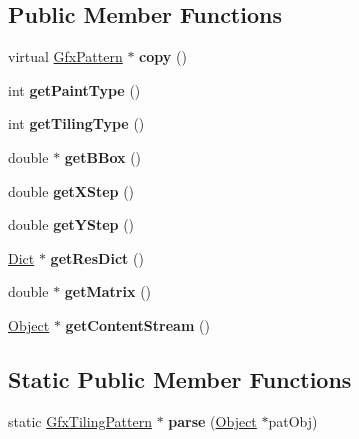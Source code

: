 \subsection*{Public Member Functions}
\begin{DoxyCompactItemize}
\item 
\mbox{\label{class_gfx_tiling_pattern_ad86dcaf392c91d2ad95fc2214c6b4737}} 
virtual \hyperlink{class_gfx_pattern}{Gfx\+Pattern} $\ast$ {\bfseries copy} ()
\item 
\mbox{\label{class_gfx_tiling_pattern_ade1ea4ccd6fb76109da0bf9f517b2628}} 
int {\bfseries get\+Paint\+Type} ()
\item 
\mbox{\label{class_gfx_tiling_pattern_a24e7c49949a5c9c40141f21ebb6ab4d8}} 
int {\bfseries get\+Tiling\+Type} ()
\item 
\mbox{\label{class_gfx_tiling_pattern_a373701b20f8de015817cc11d4bf5f46f}} 
double $\ast$ {\bfseries get\+B\+Box} ()
\item 
\mbox{\label{class_gfx_tiling_pattern_ac47208c6949553ac15e4c19aac22b99a}} 
double {\bfseries get\+X\+Step} ()
\item 
\mbox{\label{class_gfx_tiling_pattern_aa9f50e4b1390d965c4ff90327360d3cd}} 
double {\bfseries get\+Y\+Step} ()
\item 
\mbox{\label{class_gfx_tiling_pattern_ad7c896c28d29508bd7ade017209c1609}} 
\hyperlink{class_dict}{Dict} $\ast$ {\bfseries get\+Res\+Dict} ()
\item 
\mbox{\label{class_gfx_tiling_pattern_a65a6902f47aee28513b0a1ba3712165f}} 
double $\ast$ {\bfseries get\+Matrix} ()
\item 
\mbox{\label{class_gfx_tiling_pattern_ac5208101bf57b06cf8f42209671af12b}} 
\hyperlink{class_object}{Object} $\ast$ {\bfseries get\+Content\+Stream} ()
\end{DoxyCompactItemize}
\subsection*{Static Public Member Functions}
\begin{DoxyCompactItemize}
\item 
\mbox{\label{class_gfx_tiling_pattern_a3223db8510c9fd475099abe1d4af7767}} 
static \hyperlink{class_gfx_tiling_pattern}{Gfx\+Tiling\+Pattern} $\ast$ {\bfseries parse} (\hyperlink{class_object}{Object} $\ast$pat\+Obj)
\end{DoxyCompactItemize}



